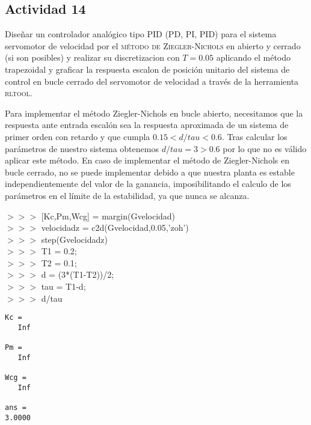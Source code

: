 \newpage
\subsection{Actividad 14}
Diseñar un controlador analógico tipo PID (PD, PI, PID) para el
sistema servomotor de velocidad por el \textsc{método de Ziegler-Nichols} en
abierto y cerrado (si son posibles) y realizar su discretizacion con
$T=0.05$ aplicando el método trapezoidal y graficar la respuesta escalon
de posición unitario del sistema de control en bucle cerrado del
servomotor de velocidad a través de la herramienta \textsc{rltool}.

Para implementar el método Ziegler-Nichols en bucle abierto,
necesitamos que la respuesta ante entrada escalón sea la respuesta
aproximada de un sistema de primer orden con retardo y que cumpla
$0.15<d/tau<0.6$. Tras calcular los parámetros de nuestro sistema
obtenemos $d/tau = 3 > 0.6$ por lo que no es válido aplicar este
método. En caso de implementar el método de Ziegler-Nichols en bucle
cerrado, no se puede implementar debido a que nuestra planta es
estable independientemente del valor de la ganancia, imposibilitando
el calculo de los parámetros en el límite de la estabilidad, ya que
nunca se alcanza.

\begin{tcolorbox}[sharp corners, colframe=bluebox, title= Método de Ziegler-Nichols,breakable=unlimited]
$>>>$ [Kc,Pm,Wcg] = margin(Gvelocidad)\\
$>>>$ velocidadz = c2d(Gvelocidad,0.05,'zoh')\\
$>>>$ step(Gvelocidadz)\\
$>>>$ T1 = 0.2;\\
$>>>$ T2 = 0.1;\\
$>>>$ d = (3*(T1-T2))/2;\\
$>>>$ tau = T1-d;\\
$>>>$ d/tau\\

  \begin{tcolorbox}[sharp corners, colback = white]
    \color{gray}
\begin{verbatim}
Kc =
   Inf

Pm =
   Inf

Wcg =
   Inf

ans =
3.0000
\end{verbatim}
  \end{tcolorbox}%

 \end{tcolorbox}%


